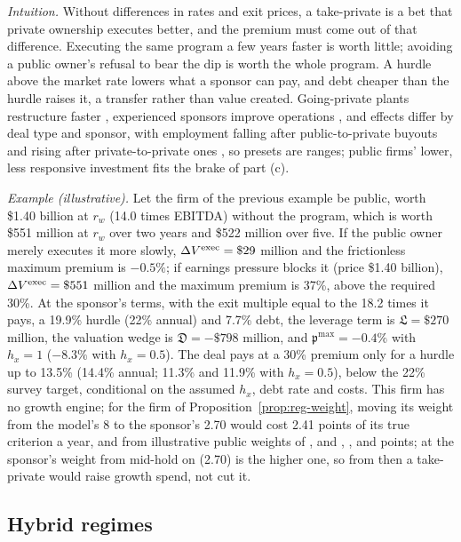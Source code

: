 \noindent\emph{Intuition.} Without differences in rates and exit prices, a take-private is a bet that private ownership executes better, and the premium must come out of that difference. Executing the same program a few years faster is worth little; avoiding a public owner's refusal to bear the dip is worth the whole program. A hurdle above the market rate lowers what a sponsor can pay, and debt cheaper than the hurdle raises it, a transfer rather than value created. Going-private plants restructure faster \citep{bharath2014do}, experienced sponsors improve operations \citep{bernstein2016operational}, and effects differ by deal type and sponsor, with employment falling after public-to-private buyouts and rising after private-to-private ones \citep{davis2019heterogenous}, so presets are ranges; public firms' lower, less responsive investment \citep{asker2015corporate} fits the brake of part (c).

\noindent\emph{Example (illustrative).} Let the firm of the previous example be public, worth \$1.40 billion at $r_w$ (14.0 times EBITDA) without the program, which is worth \$551 million at $r_w$ over two years and \$522 million over five. If the public owner merely executes it more slowly, $\Delta V^{\rm exec}=\$29$ million and the frictionless maximum premium is $-0.5\%$; if earnings pressure blocks it (price \$1.40 billion), $\Delta V^{\rm exec}=\$551$ million and the maximum premium is 37\%, above the required 30\%. At the sponsor's terms, with the exit multiple equal to the 18.2 times it pays, a 19.9\% hurdle (22\% annual) and 7.7\% debt, the leverage term is $\mathfrak L=\$270$ million, the valuation wedge is $\mathfrak D=-\$798$ million, and $\mathfrak p^{\max}=-0.4\%$ with $h_x=1$ ($-8.3\%$ with $h_x=0.5$). The deal pays at a 30\% premium only for a hurdle up to 13.5\% (14.4\% annual; 11.3\% and 11.9\% with $h_x=0.5$), below the 22\% survey target, conditional on the assumed $h_x$, debt rate and costs. This firm has no growth engine; for the firm of Proposition~\ref{prop:reg-weight}, moving its weight from the model's 8 to the sponsor's 2.70 would cost 2.41 points of its true criterion a year, and from illustrative public weights of \regXbOne, \regXbTwo{} and \regXbThree, \regXbLossPEOne, \regXbLossPETwo{} and \regXbLossPEThree{} points; at \regXbOne{} the sponsor's weight from mid-hold on (2.70) is the higher one, so from then a take-private would raise growth spend, not cut it. %

\subsection{Hybrid regimes}\label{sec:regimes-hybrid}

